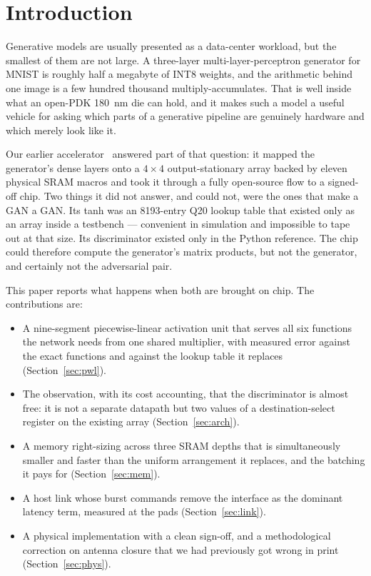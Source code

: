 \documentclass[conference,a4paper]{APSIPA2026}
\begin{document}
\section{Introduction}
Generative models are usually presented as a data-center workload, but the smallest of them are not large. A three-layer multi-layer-perceptron generator for MNIST is roughly half a megabyte of INT8 weights, and the arithmetic behind one image is a few hundred thousand multiply-accumulates. That is well inside what an open-PDK 180~nm die can hold, and it makes such a model a useful vehicle for asking which parts of a generative pipeline are genuinely hardware and which merely look like it.

Our earlier accelerator~\cite{apic_a} answered part of that question: it mapped the generator's dense layers onto a $4\times4$ output-stationary array backed by eleven physical SRAM macros and took it through a fully open-source flow to a signed-off chip. Two things it did not answer, and could not, were the ones that make a GAN a GAN. Its tanh was an 8193-entry Q20 lookup table that existed only as an array inside a testbench --- convenient in simulation and impossible to tape out at that size. Its discriminator existed only in the Python reference. The chip could therefore compute the generator's matrix products, but not the generator, and certainly not the adversarial pair.

This paper reports what happens when both are brought on chip. The contributions are:

\begin{itemize}
\item A nine-segment piecewise-linear activation unit that serves all six functions the network needs from one shared multiplier, with measured error against the exact functions and against the lookup table it replaces (Section~\ref{sec:pwl}).
\item The observation, with its cost accounting, that the discriminator is almost free: it is not a separate datapath but two values of a destination-select register on the existing array (Section~\ref{sec:arch}).
\item A memory right-sizing across three SRAM depths that is simultaneously smaller and faster than the uniform arrangement it replaces, and the batching it pays for (Section~\ref{sec:mem}).
\item A host link whose burst commands remove the interface as the dominant latency term, measured at the pads (Section~\ref{sec:link}).
\item A physical implementation with a clean sign-off, and a methodological correction on antenna closure that we had previously got wrong in print (Section~\ref{sec:phys}).
\end{itemize}
\end{document}
